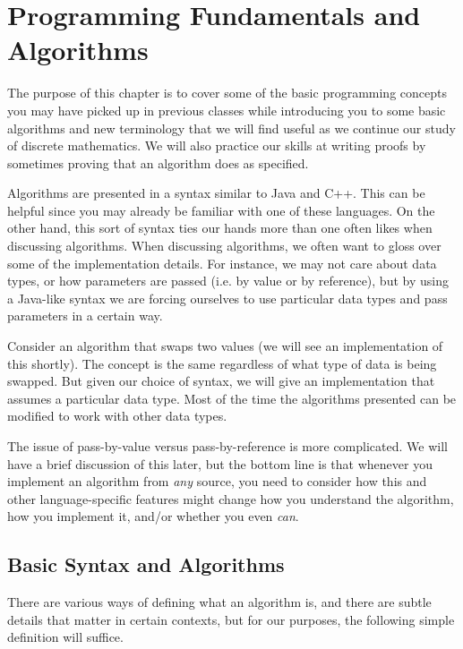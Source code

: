 \chapter{Programming Fundamentals and Algorithms}\label{ch:algs}
The purpose of this chapter is to cover some of the 
basic programming concepts you 
may have picked up in previous classes while introducing you to some basic 
algorithms and new terminology that we will find useful as we continue our study of
discrete mathematics.
We will also practice our skills at writing proofs 
by sometimes proving that
an algorithm does as specified. 
 
Algorithms are presented in a syntax similar to Java and C++.  
This can be helpful since you may already be familiar with
one of these languages.  
On the other hand, this sort of syntax ties our hands more than one often likes when
discussing algorithms. When discussing algorithms, 
we often want to gloss over some of the implementation details.
For instance, we may not care about data types, or how parameters are passed
(i.e. by value or by reference), but by using a Java-like syntax we are forcing
ourselves to use particular data types and pass parameters in a certain way.  

Consider an algorithm that swaps two values (we will see
an implementation of this shortly).  The concept is the same regardless of what type of data is
being swapped.  But given our choice of syntax, we will give an implementation that assumes a
particular data type.  Most of the time the algorithms presented can be modified to work with
other data types.  

The issue of pass-by-value versus pass-by-reference is more complicated.  We will have a brief
discussion of this later, but the bottom line is that whenever you implement an algorithm from
{\em any} source, you need to consider how this and other language-specific features might
change how you understand the algorithm, how you implement it, and/or whether you even {\em can}.

\section{Basic Syntax and Algorithms}\label{section:algorithms}
There are various ways of defining what an algorithm is, and
there are subtle details that matter in certain contexts, but for
our purposes, the following simple definition will suffice.

